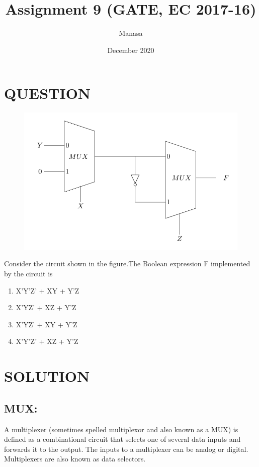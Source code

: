 \documentclass{report}
\title{Assignment 9 (GATE, EC 2017-16)}
\author{Manasa}
\date{December 2020}
\begin{document}
\maketitle
\section{QUESTION}
\begin{figure}[htp]
        \centering
        \includegraphics[width=17cm]{Figure.pdf}
         \caption{}
        \label{fig:ok}
\end{figure}
\huge
Consider the circuit shown in the figure.The Boolean expression F implemented by the circuit is

 \begin{enumerate}
 \item X'Y'Z' + XY + Y'Z
\item X'YZ' + XZ + Y'Z
\item X'YZ' + XY + Y'Z
\item X'Y'Z' + XZ + Y'Z
  \end{enumerate}



\section{SOLUTION}
\subsection{MUX:}

A multiplexer (sometimes spelled multiplexor and also known as a MUX) is defined as a combinational circuit that selects one of several data inputs and forwards it to the output. The inputs to a multiplexer can be analog or digital. Multiplexers are also known as data selectors.
\end{document}
